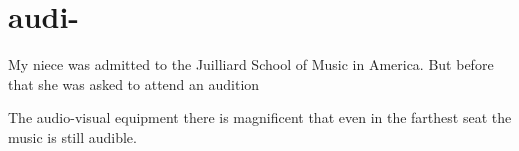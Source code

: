 \chapter{audi-}

\begin{vocabulary}[audio]
\end{vocabulary}

\begin{vocabulary}[audience]
\end{vocabulary}

\begin{vocabulary}[audition] 
    My  niece  was admitted  to  the Juilliard School of Music  in  America. But before that she was asked to attend an audition
\end{vocabulary}

\begin{vocabulary}[auditorium]
\end{vocabulary}

\begin{vocabulary}
    The audio-visual equipment there  is  magnificent that even  in the  farthest seat the music is still audible.
\end{vocabulary}

